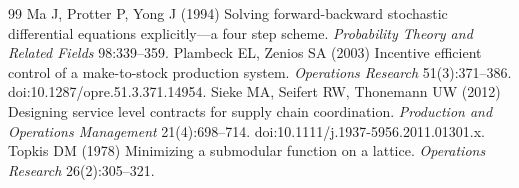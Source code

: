 \begin{thebibliography}{99}
Ma J, Protter P, Yong J (1994) Solving forward-backward stochastic differential equations explicitly---a four step scheme. \emph{Probability Theory and Related Fields} 98:339--359.
Plambeck EL, Zenios SA (2003) Incentive efficient control of a make-to-stock production system. \emph{Operations Research} 51(3):371--386. doi:10.1287/opre.51.3.371.14954.
Sieke MA, Seifert RW, Thonemann UW (2012) Designing service level contracts for supply chain coordination. \emph{Production and Operations Management} 21(4):698--714. doi:10.1111/j.1937-5956.2011.01301.x.
Topkis DM (1978) Minimizing a submodular function on a lattice. \emph{Operations Research} 26(2):305--321.
\end{thebibliography}

